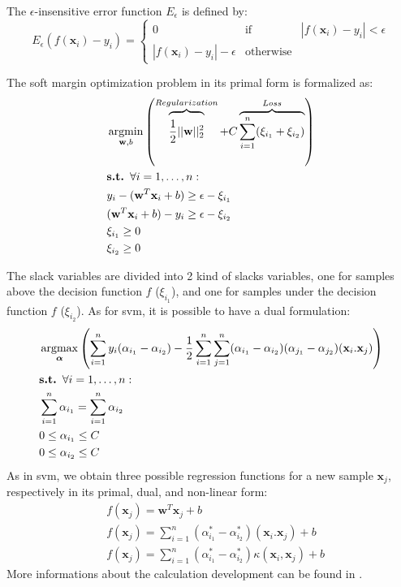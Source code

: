\noindent The $\epsilon$-insensitive error function $E_{\epsilon}$ is defined by:
\begin{equation}
E_{\epsilon} (f(\textbf{x}_i)-y_i) =
\left\lbrace
\begin{array}{lll}
0  								& \mbox{if} 		& |f(\textbf{x}_i)-y_i| < \epsilon\\
|f(\textbf{x}_i)-y_i|-\epsilon 	& \mbox{otherwise}  & 
\end{array}\right.
\end{equation}


\noindent The soft margin optimization problem in its primal form is formalized as:
	\begin{align}
		& \argmin_{\textbf{w},b}  \left( 
		\overbrace{\vphantom{\sum_{i=1}^n \xi_i}
			\frac{1}{2}||\textbf{w}||^2_2}^{Regularization}
		+ C \overbrace{\sum\limits_{i=1}^{n}(\xi_{i_1}+\xi_{i_2})}^{Loss}
		\right) 
		\label{eq:objectiveSVR}\\
		& \textbf{s.t. } \forall i=1, \ldots, n: \nonumber\\
		& y_i-(\textbf{w}^T\textbf{x}_i+b) \geq \epsilon -\xi_{i_1} \\
		& (\textbf{w}^T\textbf{x}_i+b)-y_i \geq \epsilon -\xi_{i_2} \\
		&  \xi_{i_1} \geq 0 \\
		&  \xi_{i_2} \geq 0
	\end{align}

\noindent The slack variables are divided into 2 kind of slacks variables, one for samples above the decision function $f$ ($\xi_{i_1}$), and one for samples under the decision function $f$ ($\xi_{i_2}$). As for {\sc svm}, it is possible to have a dual formulation:
	\begin{align}
		& \argmax_{\boldsymbol{\alpha}} 
		\left( 
		\sum\limits_{i=1}^{n} y_i(\alpha_{i_1}-\alpha_{i_2})
		-\frac{1}{2} \sum\limits_{i=1}^{n} \sum\limits_{j=1}^{n} (\alpha_{i_1}-\alpha_{i_2})(\alpha_{j_1}-\alpha_{j_2}) (\textbf{x}_i.\textbf{x}_j)
		\right) \\ 
		& \textbf{s.t. } \forall i=1, \ldots, n: \nonumber\\
		& \sum\limits_{i=1}^{n} \alpha_{i_1} = \sum\limits_{i=1}^{n} \alpha_{i_2} \\
		& 0 \leq \alpha_{i_1} \leq C \\
		& 0 \leq \alpha_{i_2} \leq C
	\end{align}
\noindent As in {\sc svm}, we obtain three possible regression functions for a new sample $\textbf{x}_j$, respectively in its primal, dual, and non-linear form:
\begin{align}
	& f(\textbf{x}_j) = \textbf{w}^T\textbf{x}_j+b \\ 
	& f(\textbf{x}_j) = \sum\limits_{i=1}^{n} (\alpha_{i_1}^*-\alpha_{i_2}^*)(\textbf{x}_i.\textbf{x}_j) + b \\	
	& f(\textbf{x}_j) = \sum\limits_{i=1}^{n} (\alpha_{i_1}^*-\alpha_{i_2}^*)\kappa(\textbf{x}_i,\textbf{x}_j) + b
\end{align}	
More informations about the calculation development can be found in \cite{Bishop2006}.

